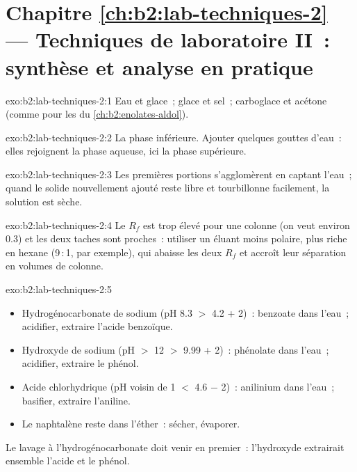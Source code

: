\section*{Chapitre \ref{ch:b2:lab-techniques-2} --- Techniques de laboratoire II~: synthèse et analyse en pratique}

\begin{solution}{exo:b2:lab-techniques-2:1}
Eau et glace~; glace et sel~; carboglace et acétone (comme pour les  du \cref{ch:b2:enolates-aldol}).
\end{solution}

\begin{solution}{exo:b2:lab-techniques-2:2}
La phase inférieure. Ajouter quelques gouttes d'eau~: elles rejoignent la phase aqueuse, ici la phase supérieure.
\end{solution}

\begin{solution}{exo:b2:lab-techniques-2:3}
Les premières portions s'agglomèrent en captant l'eau~; quand le solide nouvellement ajouté reste libre et
tourbillonne facilement, la solution est sèche.
\end{solution}

\begin{solution}{exo:b2:lab-techniques-2:4}
Le $R_f$ est trop élevé pour une colonne (on veut environ 0.3) et les deux taches sont proches~: utiliser un
éluant moins polaire, plus riche en hexane (9\,:\,1, par exemple), qui abaisse les deux $R_f$ et accroît leur
séparation en volumes de colonne.
\end{solution}

\begin{solution}{exo:b2:lab-techniques-2:5}
\begin{itemize}
  \item Hydrogénocarbonate de sodium (pH 8.3 $>$ 4.2 + 2)~: benzoate dans l'eau~; acidifier, extraire l'acide benzoïque.
  \item Hydroxyde de sodium (pH $>$ 12 $>$ 9.99 + 2)~: phénolate dans l'eau~; acidifier, extraire le phénol.
  \item Acide chlorhydrique (pH voisin de 1 $<$ 4.6 $-$ 2)~: anilinium dans l'eau~; basifier, extraire l'aniline.
  \item Le naphtalène reste dans l'éther~: sécher, évaporer.
\end{itemize}
Le lavage à l'hydrogénocarbonate doit venir en premier~: l'hydroxyde extrairait ensemble l'acide et le phénol.
\end{solution}

